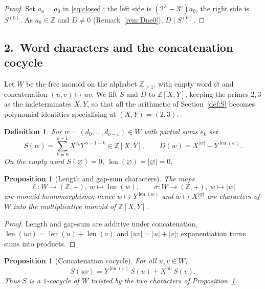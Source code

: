 \documentclass[11pt,a4paper]{article}
\theoremstyle{bourbaki}
\newtheorem{prop}[thm]{Proposition}
\theoremstyle{bourbakidef}
\newtheorem{defn}[thm]{Definition}
\newcommand{\Z}{\mathbb{Z}}
\DeclareMathOperator{\len}{len}
\begin{document}
\begin{proof}
Set $a_{o}=a_{0}$ in \eqref{eq:closed}; the left side is $(2^{E}-3^{o})a_{0}$, the right
side is $S^{(0)}$. As $a_{0}\in\Z$ and $D\ne 0$ (Remark~\ref{rem:Dne0}), $D\mid S^{(0)}$.
\end{proof}

\subsection*{2.\ Word characters and the concatenation cocycle}

Let $W$ be the free monoid on the alphabet $\Z_{\ge 1}$, with empty word $\varnothing$ and
concatenation $(u,v)\mapsto uv$. We lift $S$ and $D$ to $\Z[X,Y]$, keeping the primes
$2,3$ as the indeterminates $X,Y$, so that all the arithmetic of
Section~\ref{def:S} becomes polynomial identities specialising at $(X,Y)=(2,3)$.

\begin{defn}\label{def:Spoly}
For $w=(d_{0},\dots,d_{o-1})\in W$ with partial sums $e_{k}$ set
\[
   S(w)=\sum_{k=0}^{o-1}X^{e_{k}}Y^{\,o-1-k}\in\Z[X,Y],\qquad
   D(w)=X^{\lvert w\rvert}-Y^{\len(w)} .
\]
On the empty word $S(\varnothing)=0$, $\len(\varnothing)=\lvert\varnothing\rvert=0$.
\end{defn}

\begin{prop}[Length and gap-sum characters]\label{prop:char}
The maps
\[
   \ell:W\to(\Z,+),\ w\mapsto\len(w),\qquad
   \sigma:W\to(\Z,+),\ w\mapsto\lvert w\rvert
\]
are monoid homomorphisms; hence $w\mapsto Y^{\len(w)}$ and $w\mapsto X^{\lvert w\rvert}$
are characters of $W$ into the multiplicative monoid of $\Z[X,Y]$.
\end{prop}

\begin{proof}
Length and gap-sum are additive under concatenation, $\len(uv)=\len(u)+\len(v)$ and
$\lvert uv\rvert=\lvert u\rvert+\lvert v\rvert$; exponentiation turns sums into products.
\end{proof}

\begin{prop}[Concatenation cocycle]\label{prop:cocycle}
For all $u,v\in W$,
\begin{equation}\label{eq:cocycle}
   S(uv)=Y^{\len(v)}\,S(u)+X^{\lvert u\rvert}\,S(v).
\end{equation}
Thus $S$ is a $1$-cocycle of $W$ twisted by the two characters of
Proposition~\ref{prop:char}.
\end{prop}
\end{document}
